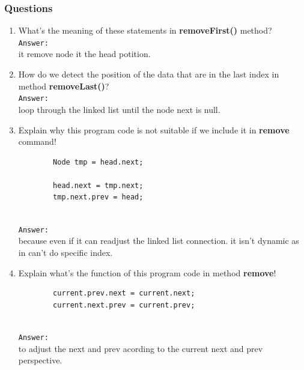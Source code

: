 \documentclass[12pt,titlepage]{article}
\begin{document}
\subsubsection{Questions}
\begin{enumerate}
    \item What’s the meaning of these statements in \textbf{removeFirst()} method?
    \mbox{}\\
    \texttt{Answer: }
    \mbox{}\\
    it remove node it the head potition.
    \item How do we detect the position of the data that are in the last index in method \textbf{removeLast()}?
    \mbox{}\\
    \texttt{Answer: }
    \mbox{}\\
    loop through the linked list until the node next is null.
    \item Explain why this program code is not suitable if we include it in \textbf{remove} command!
    \begin{verbatim}
        Node tmp = head.next;

        head.next = tmp.next;
        tmp.next.prev = head;
    \end{verbatim}
    \mbox{}\\
    \texttt{Answer: }
    \mbox{}\\
    because even if it can readjust the linked list connection. it isn't dynamic as in can't do specific index.
    \item Explain what’s the function of this program code in method \textbf{remove}!
    \begin{verbatim}
        current.prev.next = current.next;
        current.next.prev = current.prev;
    \end{verbatim}
    \mbox{}\\
    \texttt{Answer: }
    \mbox{}\\
    to adjust the next and prev acording to the current next and prev perspective.
\end{enumerate}
\end{document}
